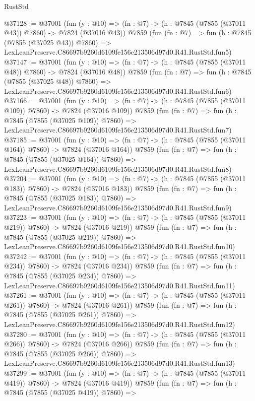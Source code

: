 \begin{lexlean}{RustStd}
\begin{coremodule}
@37128 := @37001
    (fun (y : @10) => (fn : @7) -> (h : @7845 (@7855 (@37011 @43)) @7860) -> @7824 (@37016 @43))
    @7859
    (fun (fn : @7) =>
    fun (h : @7845 (@7855 (@37025 @43)) @7860) =>
    LexLeanPreserve.C86697b9260d6109fe156e213506d97d0.R41.RustStd.fun5)
@37147 := @37001
    (fun (y : @10) => (fn : @7) -> (h : @7845 (@7855 (@37011 @48)) @7860) -> @7824 (@37016 @48))
    @7859
    (fun (fn : @7) =>
    fun (h : @7845 (@7855 (@37025 @48)) @7860) =>
    LexLeanPreserve.C86697b9260d6109fe156e213506d97d0.R41.RustStd.fun6)
@37166 := @37001
    (fun (y : @10) => (fn : @7) -> (h : @7845 (@7855 (@37011 @109)) @7860) -> @7824 (@37016 @109))
    @7859
    (fun (fn : @7) =>
    fun (h : @7845 (@7855 (@37025 @109)) @7860) =>
    LexLeanPreserve.C86697b9260d6109fe156e213506d97d0.R41.RustStd.fun7)
@37185 := @37001
    (fun (y : @10) => (fn : @7) -> (h : @7845 (@7855 (@37011 @164)) @7860) -> @7824 (@37016 @164))
    @7859
    (fun (fn : @7) =>
    fun (h : @7845 (@7855 (@37025 @164)) @7860) =>
    LexLeanPreserve.C86697b9260d6109fe156e213506d97d0.R41.RustStd.fun8)
@37204 := @37001
    (fun (y : @10) => (fn : @7) -> (h : @7845 (@7855 (@37011 @183)) @7860) -> @7824 (@37016 @183))
    @7859
    (fun (fn : @7) =>
    fun (h : @7845 (@7855 (@37025 @183)) @7860) =>
    LexLeanPreserve.C86697b9260d6109fe156e213506d97d0.R41.RustStd.fun9)
@37223 := @37001
    (fun (y : @10) => (fn : @7) -> (h : @7845 (@7855 (@37011 @219)) @7860) -> @7824 (@37016 @219))
    @7859
    (fun (fn : @7) =>
    fun (h : @7845 (@7855 (@37025 @219)) @7860) =>
    LexLeanPreserve.C86697b9260d6109fe156e213506d97d0.R41.RustStd.fun10)
@37242 := @37001
    (fun (y : @10) => (fn : @7) -> (h : @7845 (@7855 (@37011 @234)) @7860) -> @7824 (@37016 @234))
    @7859
    (fun (fn : @7) =>
    fun (h : @7845 (@7855 (@37025 @234)) @7860) =>
    LexLeanPreserve.C86697b9260d6109fe156e213506d97d0.R41.RustStd.fun11)
@37261 := @37001
    (fun (y : @10) => (fn : @7) -> (h : @7845 (@7855 (@37011 @261)) @7860) -> @7824 (@37016 @261))
    @7859
    (fun (fn : @7) =>
    fun (h : @7845 (@7855 (@37025 @261)) @7860) =>
    LexLeanPreserve.C86697b9260d6109fe156e213506d97d0.R41.RustStd.fun12)
@37280 := @37001
    (fun (y : @10) => (fn : @7) -> (h : @7845 (@7855 (@37011 @266)) @7860) -> @7824 (@37016 @266))
    @7859
    (fun (fn : @7) =>
    fun (h : @7845 (@7855 (@37025 @266)) @7860) =>
    LexLeanPreserve.C86697b9260d6109fe156e213506d97d0.R41.RustStd.fun13)
@37299 := @37001
    (fun (y : @10) => (fn : @7) -> (h : @7845 (@7855 (@37011 @419)) @7860) -> @7824 (@37016 @419))
    @7859
    (fun (fn : @7) =>
    fun (h : @7845 (@7855 (@37025 @419)) @7860) =>

\end{coremodule}
\end{lexlean}

